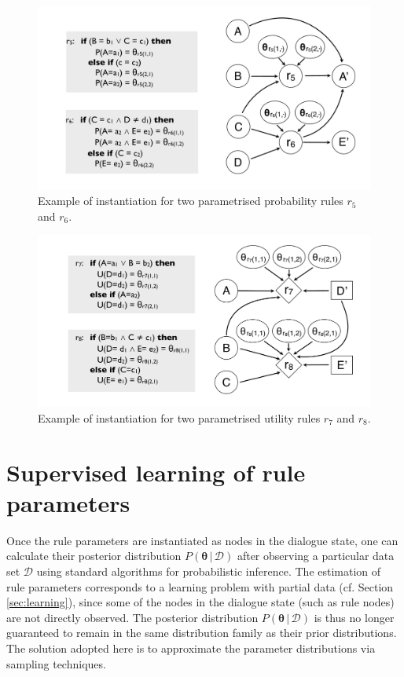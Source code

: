 \begin{figure}[h!]
\centering
\includegraphics[scale=0.25]{imgs/ruleinstantiation_params.pdf}
\caption{Example of instantiation for two parametrised probability rules $r_5$ and $r_6$.}
\label{fig:ruleinstantiation_params}
\end{figure}


\begin{figure}[h!]
\centering
\includegraphics[scale=0.25]{imgs/ruleinstantiation2_params.pdf}
\caption{Example of instantiation for two parametrised utility rules $r_7$ and $r_8$.}
\label{fig:ruleinstantiation_params2}
\end{figure}

\section{Supervised learning of rule parameters}
\label{sec:rule-supervised}

Once the rule parameters are instantiated as nodes in the dialogue state, one can calculate their posterior distribution $P(\boldsymbol\theta \, | \, \mathcal{D})$ after observing a particular data set $\mathcal{D}$ using standard algorithms for probabilistic inference. The estimation of rule parameters corresponds to a learning problem with partial data (cf. Section \ref{sec:learning}), since some of the nodes in the dialogue state (such as rule nodes) are not directly observed. The posterior distribution $P(\boldsymbol\theta \, | \, \mathcal{D})$ is thus no longer guaranteed to remain in the same distribution family as their prior distributions.  The solution adopted here is to approximate the parameter distributions via sampling techniques.

